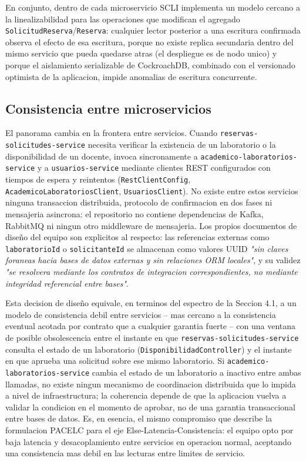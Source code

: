 \documentclass[11pt,a4paper]{article}
\begin{document}
En conjunto, dentro de cada microservicio SCLI implementa un modelo cercano a la linealizabilidad para las operaciones que modifican el agregado \texttt{SolicitudReserva}/\texttt{Reserva}: cualquier lector posterior a una escritura confirmada observa el efecto de esa escritura, porque no existe replica secundaria dentro del mismo servicio que pueda quedarse atras (el despliegue es de nodo unico) y porque el aislamiento serializable de CockroachDB, combinado con el versionado optimista de la aplicacion, impide anomalias de escritura concurrente.

\subsection{Consistencia entre microservicios}

El panorama cambia en la frontera entre servicios. Cuando \texttt{reservas-solicitudes-service} necesita verificar la existencia de un laboratorio o la disponibilidad de un docente, invoca sincronamente a \texttt{academico-laboratorios-service} y a \texttt{usuarios-service} mediante clientes REST configurados con tiempos de espera y reintentos (\texttt{RestClientConfig}, \texttt{AcademicoLaboratoriosClient}, \texttt{UsuariosClient}). No existe entre estos servicios ninguna transaccion distribuida, protocolo de confirmacion en dos fases ni mensajeria asincrona: el repositorio no contiene dependencias de Kafka, RabbitMQ ni ningun otro middleware de mensajeria. Los propios documentos de diseño del equipo son explicitos al respecto: las referencias externas como \texttt{laboratorioId} o \texttt{solicitanteId} se almacenan como valores UUID \emph{"sin claves foraneas hacia bases de datos externas y sin relaciones ORM locales"}, y su validez \emph{"se resolvera mediante los contratos de integracion correspondientes, no mediante integridad referencial entre bases"}.

Esta decision de diseño equivale, en terminos del espectro de la Seccion 4.1, a un modelo de consistencia debil entre servicios -- mas cercano a la consistencia eventual acotada por contrato que a cualquier garantia fuerte -- con una ventana de posible obsolescencia entre el instante en que \texttt{reservas-solicitudes-service} consulta el estado de un laboratorio (\texttt{DisponibilidadController}) y el instante en que aprueba una solicitud sobre ese mismo laboratorio. Si \texttt{academico-laboratorios-service} cambia el estado de un laboratorio a inactivo entre ambas llamadas, no existe ningun mecanismo de coordinacion distribuida que lo impida a nivel de infraestructura; la coherencia depende de que la aplicacion vuelva a validar la condicion en el momento de aprobar, no de una garantia transaccional entre bases de datos. Es, en esencia, el mismo compromiso que describe la formulacion PACELC para el eje Else-Latencia-Consistencia: el equipo opto por baja latencia y desacoplamiento entre servicios en operacion normal, aceptando una consistencia mas debil en las lecturas entre limites de servicio.
\end{document}
